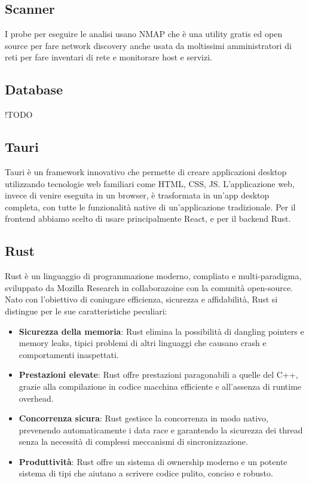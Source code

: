 \documentclass[target=bach,aauheader=,style=]{thud}
\begin{document}
\subsection{Scanner}
I probe per eseguire le analisi usano NMAP che è una utility gratis ed open source per fare network discovery anche usata da moltissimi amministratori di reti per fare inventari di rete e monitorare host e servizi. 

\subsection{Database}
!TODO

\subsection{Tauri}
Tauri è un framework innovativo che permette di creare applicazioni desktop utilizzando tecnologie web familiari come HTML, CSS, JS. L'applicazione web, invece di venire eseguita in un browser, è trasformata in un'app desktop completa, con tutte le funzionalità native di un'applicazione tradizionale.
Per il frontend abbiamo scelto di usare principalmente React, e per il backend Rust.

\subsection{Rust}
Rust è un linguaggio di programmazione moderno, compliato e multi-paradigma, sviluppato da Mozilla Research in collaborazoine con la comunità open-source. Nato con l'obiettivo di coniugare efficienza, sicurezza e affidabilità, Rust si distingue per le sue caratteristiche peculiari:
\begin{itemize}
  \item \textbf{Sicurezza della memoria}: Rust elimina la possibilità di dangling pointers e memory leaks, tipici problemi di altri linguaggi che causano crash e comportamenti inaspettati.
  \item \textbf{Prestazioni elevate}: Rust offre prestazioni paragonabili a quelle del C++, grazie alla compilazione in codice macchina efficiente e all'assenza di runtime overhead.
  \item \textbf{Concorrenza sicura}: Rust gestisce la concorrenza in modo nativo, prevenendo automaticamente i data race e garantendo la sicurezza dei thread senza la necessità di complessi meccanismi di sincronizzazione.
  \item \textbf{Produttività}: Rust offre un sistema di ownership moderno e un potente sistema di tipi che aiutano a scrivere codice pulito, conciso e robusto.
\end{itemize}
\end{document}
